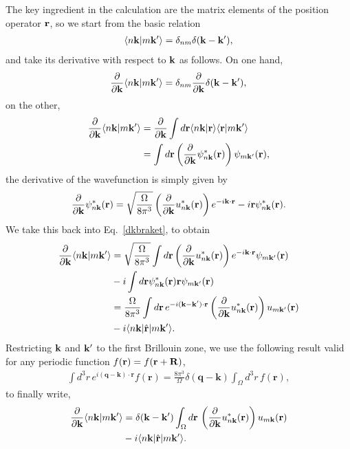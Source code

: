 The key ingredient in the calculation are the matrix elements of the
position operator $\mathbf{r}$, 
so we start from the basic relation
\begin{align}\label{nbraket}
\langle {n\mathbf{k}} | {m\mathbf{k}'} \rangle
=\delta_{nm}\delta(\mathbf{k}-\mathbf{k}'),
\end{align}
and take its derivative with respect to $\mathbf{k}$ as follows.
On one hand,
\begin{align}\label{ddk1}
\frac{\partial}{\partial\mathbf{k}}
\langle {n\mathbf{k}} | {m\mathbf{k}'} \rangle=\delta_{nm}\frac{\partial}{\partial\mathbf{k}}\delta(\mathbf{k}-\mathbf{k}'),
\end{align}
on the other,
\begin{align}\label{dkbraket}
\frac{\partial}{\partial\mathbf{k}}
\langle {n\mathbf{k}} | {m\mathbf{k}'} \rangle
&=
\frac{\partial}{\partial\mathbf{k}}
\int d\mathbf{r}
 \langle {n\mathbf{k}} | {\mathbf{r}} \rangle 
\langle {\mathbf{r}} | {m\mathbf{k}'} \rangle
\nonumber \\
&=
\int d\mathbf{r}
\left(
\frac{\partial}{\partial\mathbf{k}}
\psi^*_{n\mathbf{k}}(\mathbf{r})
\right)
\psi_{m\mathbf{k}'}(\mathbf{r}),
\end{align}
the derivative of the wavefunction is simply given by
\begin{align}\label{dpsi}
\frac{\partial}{\partial\mathbf{k}}
 \psi^*_{n\mathbf{k}}(\mathbf{r})
=
\sqrt{\frac{\Omega}{8\pi^3}}
\left(\frac{\partial}{\partial\mathbf{k}} u^*_{n\mathbf{k}}(\mathbf{r})\right)e^{-i\mathbf{k}\cdot\mathbf{r}}
-i\mathbf{r}\psi^*_{n\mathbf{k}}(\mathbf{r}).
\end{align}
We take this back into Eq.~\eqref{dkbraket}, to obtain
\begin{align}\label{dkbraket2}
\frac{\partial}{\partial\mathbf{k}}
\langle {n\mathbf{k}} | {m\mathbf{k}'} \rangle
&=
\sqrt{\frac{\Omega}{8\pi^3}}
\int d\mathbf{r}
\left(\frac{\partial}{\partial\mathbf{k}} u^*_{n\mathbf{k}}(\mathbf{r})\right)e^{-i\mathbf{k}\cdot\mathbf{r}}
 \psi_{m\mathbf{k}'}(\mathbf{r})
\nonumber \\
&-i
\int d\mathbf{r} 
\psi^*_{n\mathbf{k}}(\mathbf{r})
\mathbf{r}
 \psi_{m\mathbf{k}'}(\mathbf{r})
\nonumber \\
&=
\frac{\Omega}{8\pi^3}
\int d\mathbf{r}\,
e^{-i(\mathbf{k}-\mathbf{k}')\cdot\mathbf{r}}
\left(\frac{\partial}{\partial\mathbf{k}} u^*_{n\mathbf{k}}(\mathbf{r})\right)
u_{m\mathbf{k}'}(\mathbf{r})
\nonumber \\
&-i
\langle n\mathbf{k} |\hat{\mathbf{r}}| m\mathbf{k}' \rangle.
\end{align}
Restricting $\mathbf{k}$ and $\mathbf{k}'$ to the first Brillouin zone,
we use the following result valid for any periodic
function $f(\mathbf{r})=f(\mathbf{r}+\mathbf{R})$,
\begin{align}\label{periodic}
\int d^{3}r\, e^{i(\mathbf{q}-\mathbf{k})\cdot\mathbf{r}}f(\mathbf{r})=\frac{8\pi^{3}}{\Omega}\delta(\mathbf{q}-\mathbf{k})\int_{\Omega}d^{3}r\, f(\mathbf{r})
,
\end{align}
to
finally write,\cite{blountSSP62}
\begin{align}\label{dkbraket3}
\frac{\partial}{\partial\mathbf{k}}
\langle {n\mathbf{k}} | {m\mathbf{k}'} \rangle
&=
\delta(\mathbf{k}-\mathbf{k}')\int_\Omega d\mathbf{r}\,
\left(\frac{\partial}{\partial\mathbf{k}} u^*_{n\mathbf{k}}(\mathbf{r})\right)
u_{m\mathbf{k}}(\mathbf{r})
\nonumber \\
&-i
\langle n\mathbf{k} |\hat{\mathbf{r}}| m\mathbf{k}' \rangle.
\end{align}
